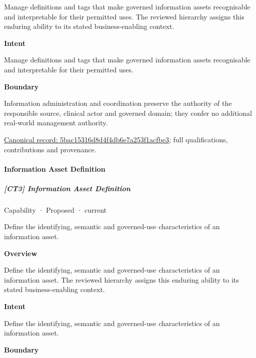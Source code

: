 Manage definitions and tags that make governed information assets recognisable and interpretable for their permitted uses. The reviewed hierarchy assigns this enduring ability to its stated business-enabling context.



\textbf{Intent}



Manage definitions and tags that make governed information assets recognisable and interpretable for their permitted uses.



\textbf{Boundary}



Information administration and coordination preserve the authority of the responsible source, clinical actor and governed domain; they confer no additional real-world management authority.


{\footnotesize \href{../../../../continuum/strategy/capability/5bac15316d8d4f4db6e7a253f1acfbe3.md}{Canonical record: 5bac15316d8d4f4db6e7a253f1acfbe3}; full qualifications, contributions and provenance.}\par
\paragraph{Information Asset Definition}

\subparagraph{[CT3] Information Asset Definition}

\label{element:05c58b2ccfcc45e9a6c70d9a569c4f61}
{\small Capability · Proposed · current}\par

Define the identifying, semantic and governed-use characteristics of an information asset.



\textbf{Overview}



Define the identifying, semantic and governed-use characteristics of an information asset. The reviewed hierarchy assigns this enduring ability to its stated business-enabling context.



\textbf{Intent}



Define the identifying, semantic and governed-use characteristics of an information asset.



\textbf{Boundary}



